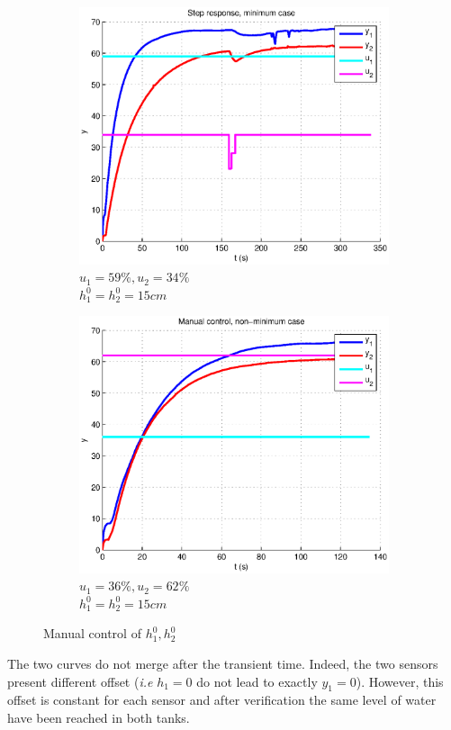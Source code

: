 \begin{figure}[h!t]
        \centering
        \begin{subfigure}[b]{0.45\columnwidth}
                \includegraphics[width=\columnwidth]{fig/manualcontrolmin.eps}
                \caption{$u_1 = 59\%, u_2 = 34\%$ \\ $h_1^0 = h_2^0 = 15cm$}
        \end{subfigure}
        \begin{subfigure}[b]{0.45\columnwidth}
                \includegraphics[width=\columnwidth]{fig/manualcontrolnonmin.eps}
                \caption{$u_1 = 36\%, u_2 = 62\%$ \\ $h_1^0 = h_2^0 = 15cm$}
        \end{subfigure}
        \caption{Manual control of $h_1^0, h_2^0$}
        \label{manualcontrol}
\end{figure}



The two curves do not merge after the transient time. Indeed, the two sensors present different offset (\emph{i.e} $h_1 = 0$ do not lead to exactly $y_1 = 0$).
However, this offset is constant for each sensor and after verification the same level of water have been reached in both tanks.

